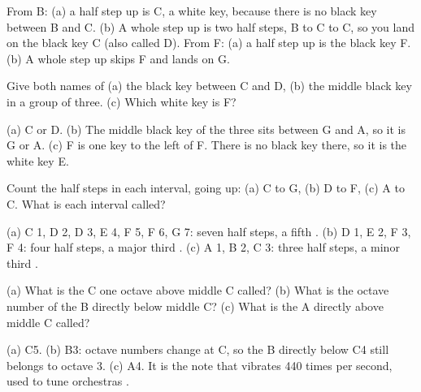 \begin{answerbox}
From B: (a) a half step up is C, a white key, because there is no black key between B and C. (b) A whole step up is two half steps, B to C to C\sh, so you land on the black key C\sh{} (also called D\fl). From F: (a) a half step up is the black key F\sh. (b) A whole step up skips F\sh{} and lands on G.
\end{answerbox}

\begin{exercise}
Give both names of (a) the black key between C and D, (b) the middle black key in a group of three. (c) Which white key is F\fl?
\end{exercise}

\begin{answerbox}
(a) C\sh{} or D\fl. (b) The middle black key of the three sits between G and A, so it is G\sh{} or A\fl. (c) F\fl{} is one key to the left of F. There is no black key there, so it is the white key E.
\end{answerbox}

\begin{exercise}
Count the half steps in each interval, going up: (a) C to G, (b) D to F\sh, (c) A to C. What is each interval called?
\end{exercise}

\begin{answerbox}
(a) C\sh{} 1, D 2, D\sh{} 3, E 4, F 5, F\sh{} 6, G 7: seven half steps, a fifth . (b) D\sh{} 1, E 2, F 3, F\sh{} 4: four half steps, a major third . (c) A\sh{} 1, B 2, C 3: three half steps, a minor third .
\end{answerbox}

\begin{exercise}
(a) What is the C one octave above middle C called? (b) What is the octave number of the B directly below middle C? (c) What is the A directly above middle C called?
\end{exercise}

\begin{answerbox}
(a) C5. (b) B3: octave numbers change at C, so the B directly below C4 still belongs to octave 3. (c) A4. It is the note that vibrates 440 times per second, used to tune orchestras .
\end{answerbox}
